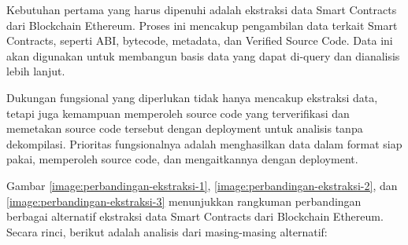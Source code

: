 Kebutuhan pertama yang harus dipenuhi adalah ekstraksi data Smart Contracts dari Blockchain Ethereum. Proses ini mencakup pengambilan data terkait Smart Contracts, seperti ABI, bytecode, metadata, dan Verified Source Code. Data ini akan digunakan untuk membangun basis data yang dapat di-query dan dianalisis lebih lanjut.

Dukungan fungsional yang diperlukan tidak hanya mencakup ekstraksi data, tetapi juga kemampuan memperoleh source code yang terverifikasi dan memetakan source code tersebut dengan deployment untuk analisis tanpa dekompilasi. Prioritas fungsionalnya adalah menghasilkan data dalam format siap pakai, memperoleh source code, dan mengaitkannya dengan deployment. 

Gambar \ref{image:perbandingan-ekstraksi-1}, \ref{image:perbandingan-ekstraksi-2}, dan \ref{image:perbandingan-ekstraksi-3} menunjukkan rangkuman perbandingan berbagai alternatif ekstraksi data Smart Contracts dari Blockchain Ethereum. Secara rinci, berikut adalah analisis dari masing-masing alternatif:

